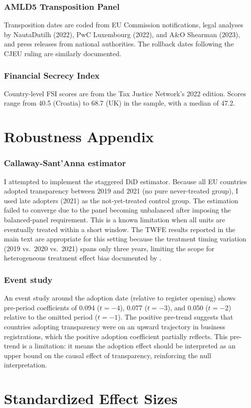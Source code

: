 \documentclass[12pt]{article}
\begin{document}
\subsubsection*{AMLD5 Transposition Panel} Transposition dates are coded from EU Commission notifications, legal analyses by NautaDutilh (2022), PwC Luxembourg (2022), and A\&O Shearman (2023), and press releases from national authorities. The rollback dates following the CJEU ruling are similarly documented.

\subsubsection*{Financial Secrecy Index} Country-level FSI scores are from the Tax Justice Network's 2022 edition. Scores range from 40.5 (Croatia) to 68.7 (UK) in the sample, with a median of 47.2.

\section{Robustness Appendix}

\subsubsection*{Callaway-Sant'Anna estimator} I attempted to implement the \citet{callaway2021difference} staggered DiD estimator. Because all EU countries adopted transparency between 2019 and 2021 (no pure never-treated group), I used late adopters (2021) as the not-yet-treated control group. The estimation failed to converge due to the panel becoming unbalanced after imposing the balanced-panel requirement. This is a known limitation when all units are eventually treated within a short window. The TWFE results reported in the main text are appropriate for this setting because the treatment timing variation (2019 vs.\ 2020 vs.\ 2021) spans only three years, limiting the scope for heterogeneous treatment effect bias documented by \citet{goodmanbacon2021difference}.

\subsubsection*{Event study} An event study around the adoption date (relative to register opening) shows pre-period coefficients of 0.094 ($t = -4$), 0.077 ($t = -3$), and 0.050 ($t = -2$) relative to the omitted period ($t = -1$). The positive pre-trend suggests that countries adopting transparency were on an upward trajectory in business registrations, which the positive adoption coefficient partially reflects. This pre-trend is a limitation: it means the adoption effect should be interpreted as an upper bound on the causal effect of transparency, reinforcing the null interpretation.

\section{Standardized Effect Sizes}
\label{sec:sde}


\end{document}
